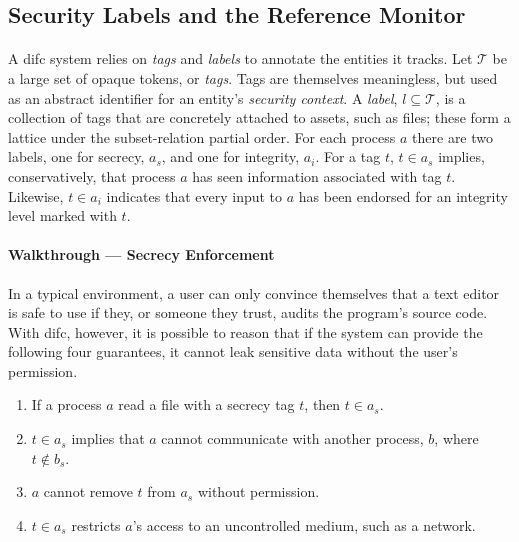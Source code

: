 \subsection{Security Labels and the Reference Monitor}

\paragraph{} A \acrshort{difc} system relies on \textit{tags} and \textit{labels} to annotate the entities it tracks. Let $\mathcal{T}$ be a large set of opaque tokens, or \textit{tags}. Tags are themselves meaningless, but used as an abstract identifier for an entity's \textit{security context}. A \textit{label}, $l \subseteq \mathcal{T}$, is a collection of tags that are concretely attached to assets, such as files; these form a lattice under the subset-relation partial order. For each process $a$ there are two labels, one for secrecy, $a_s$, and one for integrity, $a_i$. For a tag $t$, $t \in a_s$ implies, conservatively, that process $a$ has seen information associated with tag $t$. Likewise, $t \in a_i$ indicates that every input to $a$ has been endorsed for an integrity level marked with $t$.

\paragraph{Walkthrough --- Secrecy Enforcement} In a typical environment, a user can only convince themselves that a text editor is safe to use if they, or someone they trust, audits the program's source code. With \acrshort{difc}, however, it is possible to reason that if the system can provide the following four guarantees, it cannot leak sensitive data without the user's permission.

\begin{enumerate}
    \item If a process $a$ read a file with a secrecy tag $t$, then $t \in a_s$.
    \item $t \in a_s$ implies that $a$ cannot communicate with another process, $b$, where $t \notin b_s$.
    \item $a$ cannot remove $t$ from $a_s$ without permission.
    \item $t \in a_s$ restricts $a$'s access to an uncontrolled medium, such as a network.
\end{enumerate}

